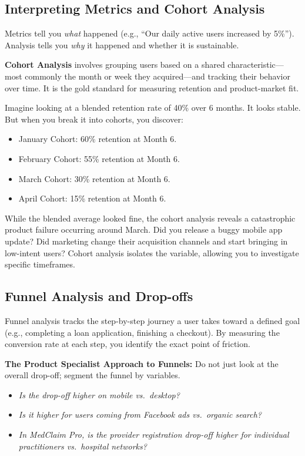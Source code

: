 \subsection{Interpreting Metrics and Cohort
Analysis}\label{interpreting-metrics-and-cohort-analysis}

Metrics tell you \emph{what} happened (e.g., ``Our daily active users
increased by 5\%''). Analysis tells you \emph{why} it happened and
whether it is sustainable.

\textbf{Cohort Analysis} involves grouping users based on a shared
characteristic---most commonly the month or week they acquired---and
tracking their behavior over time. It is the gold standard for measuring
retention and product-market fit.

Imagine looking at a blended retention rate of 40\% over 6 months. It
looks stable. But when you break it into cohorts, you discover:

\begin{itemize}
\tightlist
\item
  January Cohort: 60\% retention at Month 6.
\item
  February Cohort: 55\% retention at Month 6.
\item
  March Cohort: 30\% retention at Month 6.
\item
  April Cohort: 15\% retention at Month 6.
\end{itemize}

While the blended average looked fine, the cohort analysis reveals a
catastrophic product failure occurring around March. Did you release a
buggy mobile app update? Did marketing change their acquisition channels
and start bringing in low-intent users? Cohort analysis isolates the
variable, allowing you to investigate specific timeframes.

\subsection{Funnel Analysis and
Drop-offs}\label{funnel-analysis-and-drop-offs}

Funnel analysis tracks the step-by-step journey a user takes toward a
defined goal (e.g., completing a loan application, finishing a
checkout). By measuring the conversion rate at each step, you identify
the exact point of friction.

\textbf{The Product Specialist Approach to Funnels:} Do not just look at
the overall drop-off; segment the funnel by variables.

\begin{itemize}
\tightlist
\item
  \emph{Is the drop-off higher on mobile vs.~desktop?}
\item
  \emph{Is it higher for users coming from Facebook ads vs.~organic
  search?}
\item
  \emph{In MedClaim Pro, is the provider registration drop-off higher
  for individual practitioners vs.~hospital networks?}
\end{itemize}

